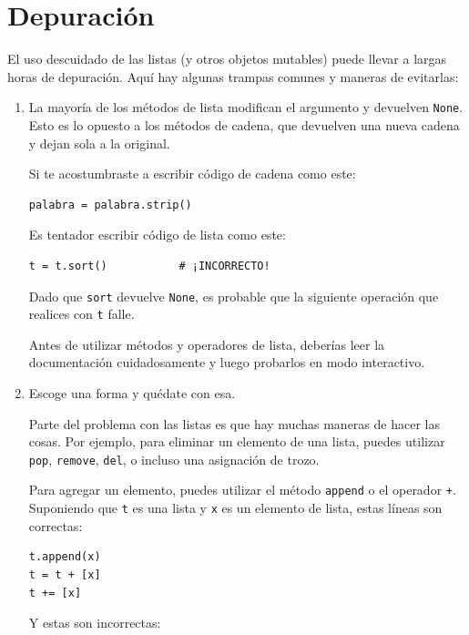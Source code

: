 \documentclass[10pt]{book}
\begin{document}
\section{Depuración}

El uso descuidado de las listas (y otros objetos mutables)
puede llevar a largas horas de depuración.  Aquí hay algunas
trampas comunes y maneras de evitarlas:

\begin{enumerate}

\item La mayoría de los métodos de lista modifican el argumento y
  devuelven {\tt None}.  Esto es lo opuesto a los métodos de cadena,
  que devuelven una nueva cadena y dejan sola a la original.

Si te acostumbraste a escribir código de cadena como este:

\begin{verbatim}
palabra = palabra.strip()
\end{verbatim}

Es tentador escribir código de lista como este:

\begin{verbatim}
t = t.sort()           # ¡INCORRECTO!
\end{verbatim}

Dado que {\tt sort} devuelve {\tt None}, es probable que la
siguiente operación que realices con {\tt t} falle.

Antes de utilizar métodos y operadores de lista, deberías leer la
documentación cuidadosamente y luego probarlos en modo interactivo.

\item Escoge una forma y quédate con esa.

Parte del problema con las listas es que hay muchas
maneras de hacer las cosas.  Por ejemplo, para eliminar un elemento de
una lista, puedes utilizar {\tt pop}, {\tt remove}, {\tt del},
o incluso una asignación de trozo.

Para agregar un elemento, puedes utilizar el método {\tt append} o
el operador {\tt +}.  Suponiendo que {\tt t} es una lista y
{\tt x} es un elemento de lista, estas líneas son correctas:

\begin{verbatim}
t.append(x)
t = t + [x]
t += [x]
\end{verbatim}

Y estas son incorrectas:


\end{enumerate}
\end{document}
